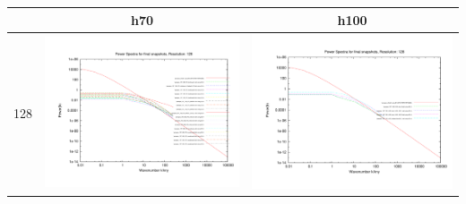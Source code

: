 \documentclass[a4paper,11pt,fleqn,oneside]{book}
\begin{document}
\begin{itemize}
\begin{table}
\begin{tabular}{l|c|c}
 & h70 & h100 \\
\hline 
 128 & \includegraphics[scale=0.2]{analysis/powerspectra/fin_powspec_combined_128_h70.pdf} & \includegraphics[scale=0.2]{analysis/powerspectra/fin_powspec_combined_128_h100.pdf} \\

\end{tabular}
\end{table}
\end{itemize}
\end{document}
